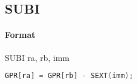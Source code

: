 \subsection{SUBI}


\paragraph{Format} SUBI ra, rb, imm

\begin{lstlisting}[language=C]
    GPR[ra] = GPR[rb] - SEXT(imm);
\end{lstlisting}